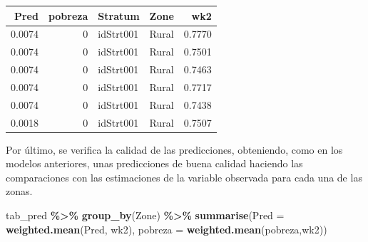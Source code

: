 \documentclass[
  spanish,
  12pt,
]{book}
\newenvironment{Shaded}{\begin{snugshade}}{\end{snugshade}}
\newcommand{\AttributeTok}[1]{\textcolor[rgb]{0.13,0.29,0.53}{#1}}
\newcommand{\DataTypeTok}[1]{\textcolor[rgb]{0.13,0.29,0.53}{#1}}
\newcommand{\DecValTok}[1]{\textcolor[rgb]{0.00,0.00,0.81}{#1}}
\newcommand{\FunctionTok}[1]{\textcolor[rgb]{0.13,0.29,0.53}{\textbf{#1}}}
\newcommand{\NormalTok}[1]{#1}
\newcommand{\OtherTok}[1]{\textcolor[rgb]{0.56,0.35,0.01}{#1}}
\newcommand{\SpecialCharTok}[1]{\textcolor[rgb]{0.81,0.36,0.00}{\textbf{#1}}}
\newcommand{\StringTok}[1]{\textcolor[rgb]{0.31,0.60,0.02}{#1}}
\begin{document}
\begin{Shaded}
\end{Shaded}

\begin{tabular}{r|r|l|l|r}
\hline
Pred & pobreza & Stratum & Zone & wk2\\
\hline
0.0074 & 0 & idStrt001 & Rural & 0.7770\\
\hline
0.0074 & 0 & idStrt001 & Rural & 0.7501\\
\hline
0.0074 & 0 & idStrt001 & Rural & 0.7463\\
\hline
0.0074 & 0 & idStrt001 & Rural & 0.7717\\
\hline
0.0074 & 0 & idStrt001 & Rural & 0.7438\\
\hline
0.0018 & 0 & idStrt001 & Rural & 0.7507\\
\hline
\end{tabular}

Por último, se verifica la calidad de las predicciones, obteniendo, como en los modelos anteriores, unas predicciones de buena calidad haciendo las comparaciones con las estimaciones de la variable observada para cada una de las zonas.

\begin{Shaded}
\begin{Highlighting}[]
\NormalTok{tab\_pred }\SpecialCharTok{\%\textgreater{}\%} \FunctionTok{group\_by}\NormalTok{(Zone) }\SpecialCharTok{\%\textgreater{}\%} 
  \FunctionTok{summarise}\NormalTok{(}\AttributeTok{Pred =} \FunctionTok{weighted.mean}\NormalTok{(Pred, wk2), }
            \AttributeTok{pobreza =} \FunctionTok{weighted.mean}\NormalTok{(pobreza,wk2))}
\end{Highlighting}
\end{Shaded}
\end{document}
